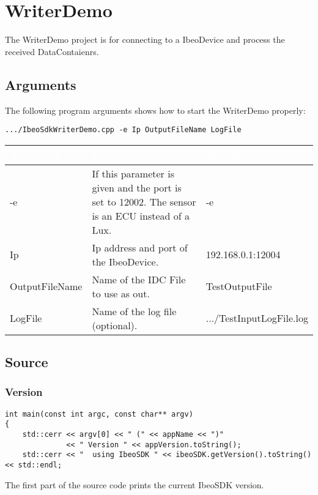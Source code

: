 \section{WriterDemo}
The WriterDemo project is for connecting to a IbeoDevice and process the received DataContaienrs.
\subsection{Arguments}
The following program arguments shows how to start the WriterDemo properly: \\
\begin{lstlisting}[numbers=none]
.../IbeoSdkWriterDemo.cpp -e Ip OutputFileName LogFile
\end{lstlisting}
\begin{table}[!htbp]
	\begin{center}
		\renewcommand{\arraystretch}{1.5}
		\begin{tabularx}{\textwidth}{| p{} | p{} | X |}
			\hline
			\cellcolor{ibeo_red} \textcolor{white}{\textbf{Argument}} & \cellcolor{ibeo_red} \textcolor{white}{\textbf{Purpose}} & \cellcolor{ibeo_red} \textcolor{white}{\textbf{Example}} \\
			\hline
			-e & If this parameter is given and the port is set to 12002. The sensor is an ECU instead of a Lux. &
			-e
			\\
			\hline
			Ip & Ip address and port of the IbeoDevice. & 192.168.0.1:12004
			\\
			\hline
			OutputFileName & Name of the IDC File to use as out. & TestOutputFile
			\\
			
			\hline
			LogFile & Name of the log file (optional). & .../TestInputLogFile.log
			\\
			
			\hline
		\end{tabularx}
	\end{center}
\end{table}
\subsection{Source}
\subsubsection{Version}
\begin{lstlisting}
int main(const int argc, const char** argv)
{
	std::cerr << argv[0] << " (" << appName << ")"
	          << " Version " << appVersion.toString();
	std::cerr << "  using IbeoSDK " << ibeoSDK.getVersion().toString() << std::endl;
\end{lstlisting}
The first part of the source code prints the current IbeoSDK version.
